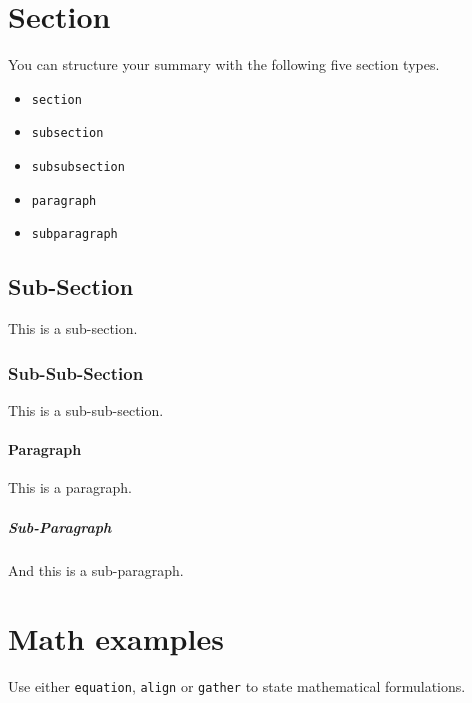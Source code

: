 \documentclass[\fontheight]{extarticle}
\begin{document}
\begin{multicols*}{3}
    
    
    
    \section{Section}
    You can structure your summary with the following five section types.
    \begin{itemize}
        \item \texttt{section}
        \item \texttt{subsection}
        \item \texttt{subsubsection}
        \item \texttt{paragraph}
        \item \texttt{subparagraph}
    \end{itemize}
    
    \subsection{Sub-Section}
    This is a sub-section.
    
    \subsubsection{Sub-Sub-Section}
    This is a sub-sub-section.
    
    \paragraph{Paragraph}
    This is a paragraph.
    
    \subparagraph{Sub-Paragraph}
    And this is a sub-paragraph.
    
    \section{Math examples}
    
    Use either \texttt{equation}, \texttt{align} or \texttt{gather} to
    state mathematical formulations.
    

\end{multicols*}
\end{document}
